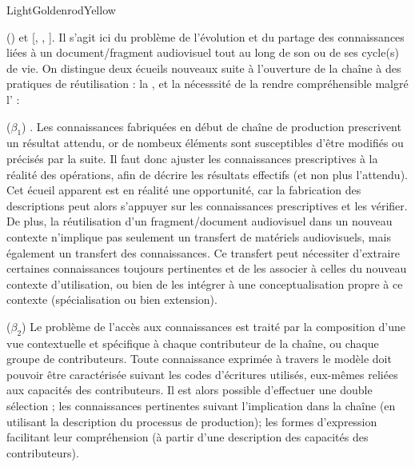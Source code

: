\begin{problemes}{LightGoldenrodYellow}
\begin{liste}
 	\item[(\g{$\alpha$})] et  [, , ].
 	Il s'agit ici du problème de l'évolution et du partage des connaissances liées à un document/fragment audiovisuel tout au long de son ou de ses cycle(s) de vie. 
 	On distingue deux écueils nouveaux suite à l'ouverture de la chaîne à des pratiques de réutilisation : la , et la nécesssité de la rendre compréhensible malgré l' : 
 	\begin{listeni}
 		\item[($\beta_1$)] .
 		Les connaissances fabriquées en début de chaîne de production prescrivent un résultat attendu, or de nombeux éléments sont susceptibles d'être modifiés ou précisés par la suite.
 		Il faut donc ajuster les connaissances prescriptives à la réalité des opérations, afin de décrire les résultats effectifs (et non plus l'attendu).
 		Cet écueil apparent est en réalité une opportunité, car la fabrication des descriptions peut alors s'appuyer sur les connaissances prescriptives et les vérifier. 
		De plus, la réutilisation d'un fragment/document audiovisuel dans un nouveau contexte n'implique pas seulement un transfert de matériels audiovisuels, mais également un transfert des connaissances. %
		Ce transfert peut nécessiter d'extraire certaines connaissances toujours pertinentes et de les associer à celles du nouveau contexte d'utilisation, ou bien de les intégrer à une conceptualisation propre à ce contexte (spécialisation ou bien extension).

		\item[($\beta_2$)] 
 		Le problème de l'accès aux connaissances est traité par la composition d'une vue contextuelle et spécifique à chaque contributeur de la chaîne, ou chaque groupe de contributeurs.
 		Toute connaissance exprimée à travers le modèle doit pouvoir être caractérisée suivant les codes d'écritures utilisés, eux-mêmes reliées aux capacités des contributeurs.
		Il est alors possible d'effectuer une double sélection ; les connaissances pertinentes suivant l'implication dans la chaîne (en utilisant la description du processus de production); les formes d'expression facilitant leur compréhension (à partir d'une description des capacités des contributeurs).
 	\end{listeni}
\end{liste}
\end{problemes}

